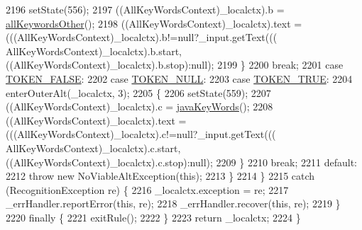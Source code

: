 \begin{DoxyCode}
2196         setState(556);
2197         ((AllKeyWordsContext)\_localctx).b = \hyperlink{classgov_1_1nasa_1_1jpf_1_1inspector_1_1server_1_1expression_1_1parser_1_1_expression_grammar_parser_a785824ede173353ed534550da827b817}{allKeywordsOther}();
2198          ((AllKeyWordsContext)\_localctx).text =  (((AllKeyWordsContext)\_localctx).b!=null?\_input.getText(((
      AllKeyWordsContext)\_localctx).b.start,((AllKeyWordsContext)\_localctx).b.stop):null); 
2199         \}
2200         \textcolor{keywordflow}{break};
2201       \textcolor{keywordflow}{case} \hyperlink{classgov_1_1nasa_1_1jpf_1_1inspector_1_1server_1_1expression_1_1parser_1_1_expression_grammar_parser_a3a0da2b7f9e20c4fd550fa90a3063a7f}{TOKEN\_FALSE}:
2202       \textcolor{keywordflow}{case} \hyperlink{classgov_1_1nasa_1_1jpf_1_1inspector_1_1server_1_1expression_1_1parser_1_1_expression_grammar_parser_a81c1cc064708bd9a1adce4bdc380b42c}{TOKEN\_NULL}:
2203       \textcolor{keywordflow}{case} \hyperlink{classgov_1_1nasa_1_1jpf_1_1inspector_1_1server_1_1expression_1_1parser_1_1_expression_grammar_parser_ae33cdae5be5688e7b11e1ed7cb749867}{TOKEN\_TRUE}:
2204         enterOuterAlt(\_localctx, 3);
2205         \{
2206         setState(559);
2207         ((AllKeyWordsContext)\_localctx).c = \hyperlink{classgov_1_1nasa_1_1jpf_1_1inspector_1_1server_1_1expression_1_1parser_1_1_expression_grammar_parser_ad2052f91a11b56131e3a746447f36634}{javaKeyWords}();
2208          ((AllKeyWordsContext)\_localctx).text =  (((AllKeyWordsContext)\_localctx).c!=null?\_input.getText(((
      AllKeyWordsContext)\_localctx).c.start,((AllKeyWordsContext)\_localctx).c.stop):null); 
2209         \}
2210         \textcolor{keywordflow}{break};
2211       \textcolor{keywordflow}{default}:
2212         \textcolor{keywordflow}{throw} \textcolor{keyword}{new} NoViableAltException(\textcolor{keyword}{this});
2213       \}
2214     \}
2215     \textcolor{keywordflow}{catch} (RecognitionException re) \{
2216       \_localctx.exception = re;
2217       \_errHandler.reportError(\textcolor{keyword}{this}, re);
2218       \_errHandler.recover(\textcolor{keyword}{this}, re);
2219     \}
2220     \textcolor{keywordflow}{finally} \{
2221       exitRule();
2222     \}
2223     \textcolor{keywordflow}{return} \_localctx;
2224   \}
\end{DoxyCode}
